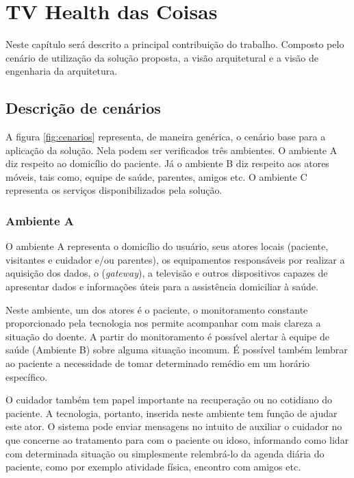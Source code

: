 \chapter{TV Health das Coisas}\label{cap:quatro}

Neste capítulo será descrito a principal contribuição do trabalho. Composto
pelo cenário de utilização da solução proposta, a visão arquitetural e a visão
de engenharia da arquitetura.

\section{Descrição de cenários}

A figura \ref{fig:cenarios} representa, de maneira genérica, o cenário base
para a aplicação da solução. Nela podem ser verificados três ambientes. O
ambiente A diz respeito ao domicílio do paciente. Já o ambiente B diz respeito
aos atores móveis, tais como, equipe de saúde, parentes, amigos etc. O ambiente
C representa os serviços disponibilizados pela solução.


\subsection{Ambiente A} \label{subsec:ambiente-a}

O ambiente A representa o domicílio do usuário, seus atores locais (paciente,
visitantes e cuidador e/ou parentes), os equipamentos responsáveis por  realizar
a aquisição dos dados, o \stb[] (\textit{gateway}), a televisão e outros
dispositivos capazes de apresentar dados e informações úteis para a assistência
domiciliar à saúde.

Neste ambiente, um dos atores é o paciente, o monitoramento constante 
proporcionado pela tecnologia nos permite acompanhar com mais clareza a situação
do doente. A partir do monitoramento é possível alertar à equipe
de saúde (Ambiente B) sobre alguma situação incomum. É possível 
também lembrar ao paciente a necessidade de tomar determinado remédio em um
horário específico.

O cuidador também tem papel importante na recuperação ou no cotidiano do 
paciente. A tecnologia, portanto, inserida neste ambiente tem função de ajudar
este ator. O sistema pode enviar mensagens no intuito de auxiliar o cuidador no
que concerne ao tratamento para com o paciente ou idoso, informando como lidar
com determinada situação ou simplesmente relembrá-lo da agenda diária do 
paciente, como por exemplo atividade física, encontro com amigos etc.

